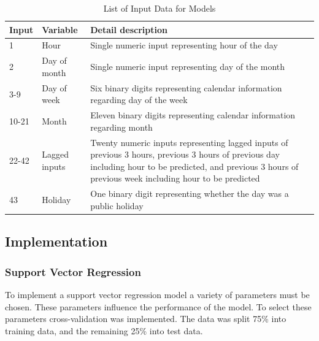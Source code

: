 \begin{table}
	\caption{List of Input Data for Models}
	\label{tab:feature}
	\begin{tabular}{p{3cm}p{3cm}p{8.5cm}}
		\toprule
		Input & Variable      & Detail description \\
		\midrule
		1     & Hour          & Single numeric input representing hour of the day                                                                                              \\
		2     & Day of month  & Single numeric input representing day of the month                                                                                             \\
		3-9   & Day of week   & Six binary digits representing calendar information regarding day of the week                                                                                            \\
		10-21 & Month         & Eleven binary digits representing calendar information regarding month                                                                                         \\
		22-42 & Lagged inputs & Twenty numeric inputs representing lagged inputs of previous 3 hours, previous 3 hours of previous day including hour to be predicted, and previous 3 hours of previous week including hour to be predicted \\
		43    & Holiday       & One binary digit representing whether the day was a public holiday  \\     \bottomrule                                                           
	\end{tabular}
\end{table}


\subsection{Implementation}

\subsubsection{Support Vector Regression}

To implement a support vector regression model a variety of parameters must be chosen. These parameters influence the performance of the model. To select these parameters cross-validation was implemented. The data was split 75\% into training data, and the remaining 25\% into test data.

